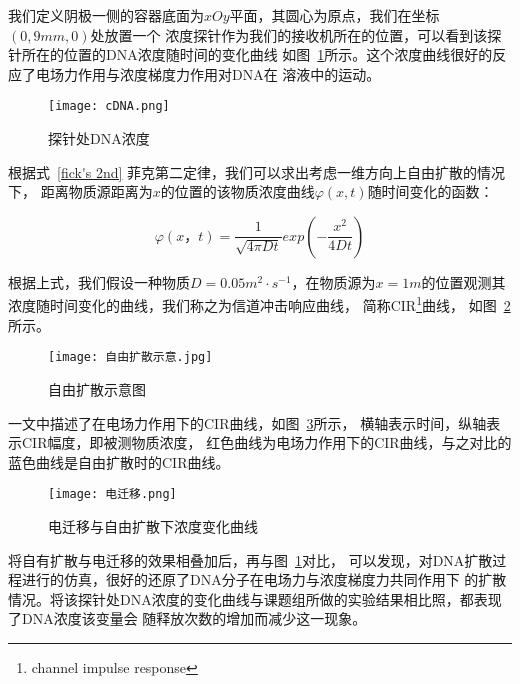 我们定义阴极一侧的容器底面为$xOy$平面，其圆心为原点，我们在坐标$(0,9mm,0)$处放置一个
浓度探针作为我们的接收机所在的位置，可以看到该探针所在的位置的DNA浓度随时间的变化曲线
如图~\ref{fig:cDNAatP}所示。这个浓度曲线很好的反应了电场力作用与浓度梯度力作用对DNA在
溶液中的运动。
\begin{figure}[H]
    \centering
    \texttt{[image: cDNA.png]}
    \caption{探针处DNA浓度}
    \label{fig:cDNAatP}
\end{figure}

根据式~\ref{fick's 2nd} 菲克第二定律，我们可以求出考虑一维方向上自由扩散的情况下，
距离物质源距离为$x$的位置的该物质浓度曲线$\varphi(x,t)$随时间变化的函数：

\begin{equation}
    \varphi(x，t)= \frac{1}{\sqrt {4 \pi Dt}} exp(-\frac{x^2}{4Dt})
\end{equation}

根据上式，我们假设一种物质$D=0.05m^2\cdot s^{-1}$，在物质源为$x=1m$的位置观测其
浓度随时间变化的曲线，我们称之为信道冲击响应曲线，
简称CIR\footnote{channel impulse response}曲线，
如图~\ref{自由扩散示意图}所示。
\begin{figure}[H]
    \centering
    \texttt{[image: 自由扩散示意.jpg]}
    \caption{自由扩散示意图}
    \label{自由扩散示意图}
\end{figure}

\parencite{8405569}一文中描述了在电场力作用下的CIR曲线，如图~\ref{电迁移}所示，
横轴表示时间，纵轴表示CIR幅度，即被测物质浓度，
红色曲线为电场力作用下的CIR曲线，与之对比的蓝色曲线是自由扩散时的CIR曲线。
\begin{figure}[H]
    \centering
    \texttt{[image: 电迁移.png]}
    \caption{电迁移与自由扩散下浓度变化曲线}
    \label{电迁移}
\end{figure}

将自有扩散与电迁移的效果相叠加后，再与图~\ref{fig:cDNAatP}对比，
可以发现，对DNA扩散过程进行的仿真，很好的还原了DNA分子在电场力与浓度梯度力共同作用下
的扩散情况。将该探针处DNA浓度的变化曲线与课题组所做的实验结果相比照，都表现了DNA浓度该变量会
随释放次数的增加而减少这一现象。